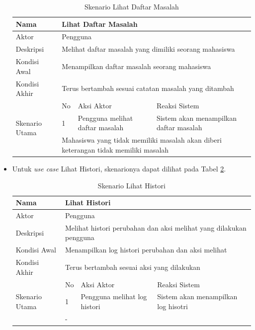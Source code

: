 \begin{itemize}
\begin{table}[ht]
\centering
\caption[Tabel Skenario Lihat Daftar Masalah]{Skenario Lihat Daftar Masalah}
\label{tab:skenariolihatmasalah}
\begin{tabular}{|p{1.4cm}|p{0.4cm}|p{2cm}|p{2cm}|p{2cm}|p{2cm}|}
\hline
Nama & \multicolumn{5}{p{8cm}|}{Lihat Daftar Masalah} \\ \hline
Aktor & \multicolumn{5}{p{8cm}|}{Pengguna} \\ \hline
Deskripsi & \multicolumn{5}{p{8cm}|}{Melihat daftar masalah yang dimiliki seorang mahasiswa} \\ \hline
Kondisi Awal & \multicolumn{5}{p{8cm}|}{Menampilkan daftar masalah seorang mahasiswa} \\ \hline
Kondisi Akhir & \multicolumn{5}{p{8cm}|}{Terus bertambah sesuai catatan masalah yang ditambah} \\ \hline
\multirow{3}{*}{\parbox{1.4cm}{Skenario Utama}} & No &
\multicolumn{2}{p{4cm}|}{Aksi Aktor} & \multicolumn{2}{p{4cm}|}{Reaksi Sistem}
\\ \cline{2-6}
& 1 & \multicolumn{2}{p{4cm}|}{Pengguna melihat daftar masalah} &
\multicolumn{2}{p{4cm}|}{Sistem akan menampilkan daftar masalah} \\ \hline
Eksepsi & \multicolumn{5}{p{8cm}|}{Mahasiswa yang tidak memiliki masalah akan diberi keterangan tidak memiliki masalah} \\ \hline
\end{tabular}
\end{table}

\item Untuk {\it use case} Lihat Histori, skenarionya dapat dilihat pada Tabel
\ref{tab:skenariohistori}.

\begin{table}[ht]
\centering
\caption[Tabel Skenario Lihat Histori]{Skenario Lihat Histori}
\label{tab:skenariohistori}
\begin{tabular}{|p{1.4cm}|p{0.4cm}|p{2cm}|p{2cm}|p{2cm}|p{2cm}|}
\hline
Nama & \multicolumn{5}{p{8cm}|}{Lihat Histori} \\ \hline
Aktor & \multicolumn{5}{p{8cm}|}{Pengguna} \\ \hline
Deskripsi & \multicolumn{5}{p{8cm}|}{Melihat histori perubahan dan aksi melihat
yang dilakukan pengguna} \\ \hline
Kondisi Awal & \multicolumn{5}{p{8cm}|}{Menampilkan log histori perubahan dan
aksi melihat} \\ \hline
Kondisi Akhir & \multicolumn{5}{p{8cm}|}{Terus bertambah sesuai aksi yang
dilakukan} \\ \hline
\multirow{3}{*}{\parbox{1.4cm}{Skenario Utama}} & No &
\multicolumn{2}{p{4cm}|}{Aksi Aktor} & \multicolumn{2}{p{4cm}|}{Reaksi Sistem}
\\ \cline{2-6}
& 1 & \multicolumn{2}{p{4cm}|}{Pengguna melihat log histori} &
\multicolumn{2}{p{4cm}|}{Sistem akan menampilkan log hisotri} \\ \hline
Eksepsi & \multicolumn{5}{p{8cm}|}{-} \\ \hline
\end{tabular}
\end{table}


\end{itemize}
